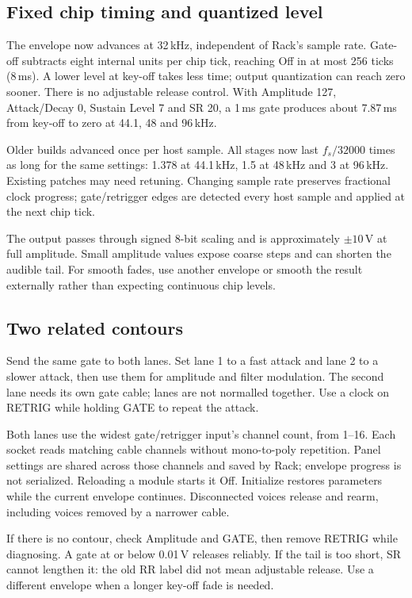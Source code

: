 \subsection{Fixed chip timing and quantized level}
The envelope now advances at 32\,kHz, independent of Rack's sample rate.
Gate-off subtracts eight internal units per chip tick, reaching Off in at
most 256 ticks (8\,ms). A lower level at key-off takes less time; output
quantization can reach zero sooner. There is no adjustable release control.
With Amplitude 127, Attack/Decay 0, Sustain Level 7 and SR 20, a 1\,ms gate
produces about 7.87\,ms from key-off to zero at 44.1, 48 and 96\,kHz.

Older builds advanced once per host sample. All stages now last
$f_s/32000$ times as long for the same settings: 1.378 at 44.1\,kHz,
1.5 at 48\,kHz and 3 at 96\,kHz. Existing patches may need retuning.
Changing sample rate preserves fractional clock progress; gate/retrigger
edges are detected every host sample and applied at the next chip tick.

The output passes through signed 8-bit scaling and is approximately
$\pm10$\,V at full amplitude. Small amplitude values expose coarse steps and
can shorten the audible tail. For smooth fades, use another envelope or
smooth the result externally rather than expecting continuous chip levels.

\subsection{Two related contours}
Send the same gate to both lanes. Set lane 1 to a fast attack and lane 2 to
a slower attack, then use them for amplitude and filter modulation. The
second lane needs its own gate cable; lanes are not normalled together.
Use a clock on RETRIG while holding GATE to repeat the attack.

Both lanes use the widest gate/retrigger input's channel count, from 1--16.
Each socket reads matching cable channels without mono-to-poly repetition.
Panel settings are shared across those channels and saved by Rack; envelope
progress is not serialized. Reloading a module starts it Off. Initialize
restores parameters while the current envelope continues. Disconnected
voices release and rearm, including voices removed by a narrower cable.

If there is no contour, check Amplitude and GATE, then remove RETRIG while
diagnosing. A gate at or below 0.01\,V releases reliably. If the tail is too
short, SR cannot lengthen it: the old RR label did not mean adjustable
release. Use a different envelope when a longer key-off fade is needed.
